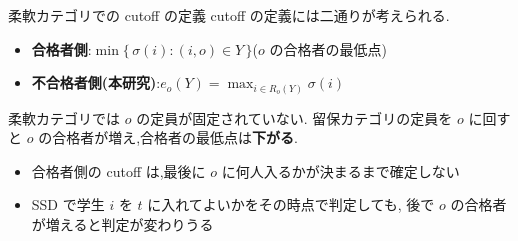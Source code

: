\documentclass[aspectratio=43,11pt]{beamer}
\newcommand{\topf}{\mathrm{top}}
\newcommand{\dtop}[1]{d^{\topf}_{#1}}
\begin{document}

\begin{frame}{柔軟カテゴリでの cutoff の定義}
cutoff の定義には二通りが考えられる.
\begin{itemize}
  \item \textbf{合格者側}:$\min\{\, \sigma(i) : (i,o) \in Y \,\}$($o$ の合格者の最低点)
  \item \textbf{不合格者側(本研究)}:$e_o(Y) = \max_{i \in R_o(Y)} \sigma(i)$
\end{itemize}
\medskip
柔軟カテゴリでは $o$ の定員が固定されていない.
留保カテゴリの定員を $o$ に回すと $o$ の合格者が増え,合格者の最低点は\textbf{下がる}.
\begin{itemize}
  \item 合格者側の cutoff は,最後に $o$ に何人入るかが決まるまで確定しない
  \item SSD で学生 $i$ を $t$ に入れてよいかをその時点で判定しても,
        後で $o$ の合格者が増えると判定が変わりうる
\end{itemize}
\end{frame}
\end{document}
